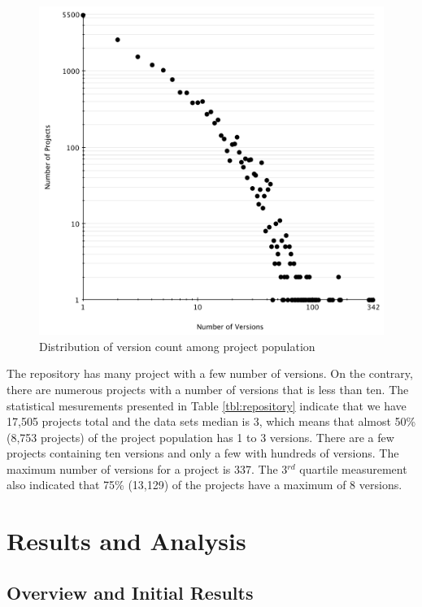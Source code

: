 \documentclass[conference]{IEEEtran}
\begin{document}
\begin{figure}
	\centering
	\includegraphics[scale=0.6]{version_count.pdf}
	\caption{Distribution of version count among project population}
	\label{fig:version-count}
\end{figure}

The repository has many project with a
few number of versions. On the contrary, there are numerous projects with a
number of versions that is less than ten.
The statistical mesurements presented in Table \ref{tbl:repository}
indicate that we have 17,505 projects total and the data sets median
is 3, which means that almost 50\% (8,753 projects) of the project
population has 1 to 3 versions. There are a few projects containing ten
versions and only a few with hundreds of versions. The maximum number of
versions for a project is 337. The 3$^{rd}$ quartile measurement
also indicated that 75\% (13,129) of the projects have a maximum of 8 versions.

\section{Results and Analysis}
\label{sec:res}

\subsection{Overview and Initial Results}
\label{sec:overview}
\end{document}
